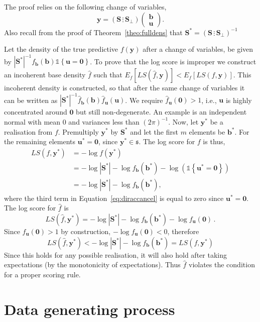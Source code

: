\documentclass[12pt]{article}
\theoremstyle{definition}
\begin{document}
The proof relies on the following change of variables,
\[
\bm{y}=\left(\bm{S}\,\vdots\,\bm{S_\perp}\right)\begin{pmatrix}\bm{b}\\\bm{u}\end{pmatrix}.
\]
Also recall from the proof of Theorem~\ref{theo:fulldens} that $\bm{S}^*=\left(\bm{S}\,\vdots\,\bm{S_\perp}\right)^{-1}$

Let the density of the true predictive $f(\bm{y})$ after a change of variables, be given by $|\bm{S^*}|^{-1}f_{\bm b}(\bm{b})\mathbb{1}\left\{\bm{u}=\bm{0}\right\}$.  To prove that the log score is improper we construct an incoherent base density $\hat{f}$ such that $E_f\left[LS\left(\hat{f},\bm{y}\right)\right]<E_f\left[LS\left(f,\bm{y}\right)\right]$. This incoherent density is constructed, so that after the same change of variables it can be written as $|\bm{S^*}|^{-1}\hat{f}_{\bm b}(\bm{b})\hat{f}_{\bm{u}}(\bm{u})$. We require $\hat{f}_{\bm u}(\bm{0})>1$, i.e., ${\bm u}$ is highly concentrated around $\bm{0}$ but still non-degenerate. An example is an independent normal with mean 0 and variances less than $(2\pi)^{-1}$. Now, let $\bm{y}^*$ be a realisation from $f$. Premultiply $\bm{y}^*$ by $\bm{S}^*$ and let the first $m$ elements be $\bm{b^*}$.  For the remaining elements ${\bm u}^*={\bm 0}$, since $\bm{y}^*\in\mathfrak{s}$.  The log score for $f$ is thus,	
\begin{align}
LS\left(f,\bm{y}^*\right) &= -\log f(\bm{y}^*) \nonumber\\
&=-\log|\bm{S^*}|-\log f_{\bm{b}}\left(\bm{b}^*\right)-\log\left(\mathbb{1}\left\{\bm{u}^*=\bm{0}\right\}\right)\label{eq:diraccancel}\\
&=-\log|\bm{S^*}|-\log f_{\bm{b}}\left(\bm{b}^*\right),\nonumber
\end{align}
where the third term in Equation~\ref{eq:diraccancel} is equal to zero since $\bm{u}^*=\bm{0}$.  The log score for $\hat{f}$ is
\[
LS\left(\hat{f},\bm{y}^*\right) = -\log|\bm{S^*}|-\log f_{\bm{b}}(\bm{b}^*)- \log f_{\bm u}(\bm{0})\,.
\]
Since $f_{\bm u}(\bm{0})>1$ by construction, $-\log f_{\bm u}(\bm{0})<0$, therefore
\[
LS\left(\hat{f},\bm{y}^*\right) <-\log|\bm{S^*}|-\log f_{\bm b}(\bm{b}^*)=LS\left(f,\bm{y}^*\right)
\]
Since this holds for any possible realisation, it will also hold after taking expectations (by the monotonicity of expectations).  Thus $\hat{f}$ violates the condition for a proper scoring rule.

\clearpage
\section{Data generating process} \label{app:DGP}
\end{document}
